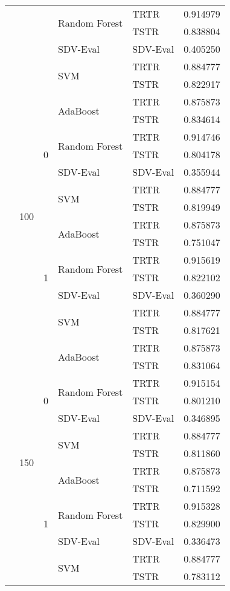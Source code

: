 \begin{longtable}{lllllr}
\cline{4-6}
 &  &  & \multirow[t]{2}{*}{Random Forest} & TRTR & 0.914979 \\
 &  &  &  & TSTR & 0.838804 \\
\cline{4-6}
 &  &  & SDV-Eval & SDV-Eval & 0.405250 \\
\cline{4-6}
 &  &  & \multirow[t]{2}{*}{SVM} & TRTR & 0.884777 \\
 &  &  &  & TSTR & 0.822917 \\
\cline{2-6} \cline{3-6} \cline{4-6}
 & \multirow[t]{14}{*}{100} & \multirow[t]{7}{*}{0} & \multirow[t]{2}{*}{AdaBoost} & TRTR & 0.875873 \\
 &  &  &  & TSTR & 0.834614 \\
\cline{4-6}
 &  &  & \multirow[t]{2}{*}{Random Forest} & TRTR & 0.914746 \\
 &  &  &  & TSTR & 0.804178 \\
\cline{4-6}
 &  &  & SDV-Eval & SDV-Eval & 0.355944 \\
\cline{4-6}
 &  &  & \multirow[t]{2}{*}{SVM} & TRTR & 0.884777 \\
 &  &  &  & TSTR & 0.819949 \\
\cline{3-6} \cline{4-6}
 &  & \multirow[t]{7}{*}{1} & \multirow[t]{2}{*}{AdaBoost} & TRTR & 0.875873 \\
 &  &  &  & TSTR & 0.751047 \\
\cline{4-6}
 &  &  & \multirow[t]{2}{*}{Random Forest} & TRTR & 0.915619 \\
 &  &  &  & TSTR & 0.822102 \\
\cline{4-6}
 &  &  & SDV-Eval & SDV-Eval & 0.360290 \\
\cline{4-6}
 &  &  & \multirow[t]{2}{*}{SVM} & TRTR & 0.884777 \\
 &  &  &  & TSTR & 0.817621 \\
\cline{2-6} \cline{3-6} \cline{4-6}
 & \multirow[t]{14}{*}{150} & \multirow[t]{7}{*}{0} & \multirow[t]{2}{*}{AdaBoost} & TRTR & 0.875873 \\
 &  &  &  & TSTR & 0.831064 \\
\cline{4-6}
 &  &  & \multirow[t]{2}{*}{Random Forest} & TRTR & 0.915154 \\
 &  &  &  & TSTR & 0.801210 \\
\cline{4-6}
 &  &  & SDV-Eval & SDV-Eval & 0.346895 \\
\cline{4-6}
 &  &  & \multirow[t]{2}{*}{SVM} & TRTR & 0.884777 \\
 &  &  &  & TSTR & 0.811860 \\
\cline{3-6} \cline{4-6}
 &  & \multirow[t]{7}{*}{1} & \multirow[t]{2}{*}{AdaBoost} & TRTR & 0.875873 \\
 &  &  &  & TSTR & 0.711592 \\
\cline{4-6}
 &  &  & \multirow[t]{2}{*}{Random Forest} & TRTR & 0.915328 \\
 &  &  &  & TSTR & 0.829900 \\
\cline{4-6}
 &  &  & SDV-Eval & SDV-Eval & 0.336473 \\
\cline{4-6}
 &  &  & \multirow[t]{2}{*}{SVM} & TRTR & 0.884777 \\
 &  &  &  & TSTR & 0.783112 \\
\cline{1-6} \cline{2-6} \cline{3-6} \cline{4-6}
\end{longtable}
